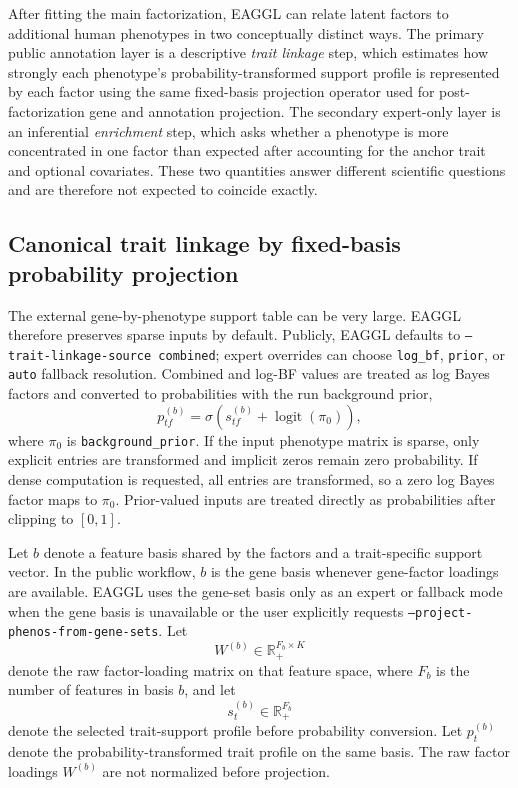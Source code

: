 \documentclass[11pt]{article}
\begin{document}
After fitting the main factorization, EAGGL can relate latent factors to additional human phenotypes in two conceptually distinct ways. The primary public annotation layer is a descriptive \emph{trait linkage} step, which estimates how strongly each phenotype's probability-transformed support profile is represented by each factor using the same fixed-basis projection operator used for post-factorization gene and annotation projection. The secondary expert-only layer is an inferential \emph{enrichment} step, which asks whether a phenotype is more concentrated in one factor than expected after accounting for the anchor trait and optional covariates. These two quantities answer different scientific questions and are therefore not expected to coincide exactly.

\subsection{Canonical trait linkage by fixed-basis probability projection}

The external gene-by-phenotype support table can be very large. EAGGL therefore preserves sparse inputs by default. Publicly, EAGGL defaults to \texttt{--trait-linkage-source combined}; expert overrides can choose \texttt{log\_bf}, \texttt{prior}, or \texttt{auto} fallback resolution. Combined and log-BF values are treated as log Bayes factors and converted to probabilities with the run background prior,
\[
p_{tf}^{(b)} = \sigma\left(s_{tf}^{(b)} + \operatorname{logit}(\pi_0)\right),
\]
where $\pi_0$ is \texttt{background\_prior}. If the input phenotype matrix is sparse, only explicit entries are transformed and implicit zeros remain zero probability. If dense computation is requested, all entries are transformed, so a zero log Bayes factor maps to $\pi_0$. Prior-valued inputs are treated directly as probabilities after clipping to $[0,1]$.

Let $b$ denote a feature basis shared by the factors and a trait-specific support vector. In the public workflow, $b$ is the gene basis whenever gene-factor loadings are available. EAGGL uses the gene-set basis only as an expert or fallback mode when the gene basis is unavailable or the user explicitly requests \texttt{--project-phenos-from-gene-sets}. Let
\[
W^{(b)} \in \mathbb{R}_+^{F_b \times K}
\]
denote the raw factor-loading matrix on that feature space, where $F_b$ is the number of features in basis $b$, and let
\[
s_t^{(b)} \in \mathbb{R}_+^{F_b}
\]
denote the selected trait-support profile before probability conversion. Let $p_t^{(b)}$ denote the probability-transformed trait profile on the same basis. The raw factor loadings $W^{(b)}$ are not normalized before projection.
\end{document}
